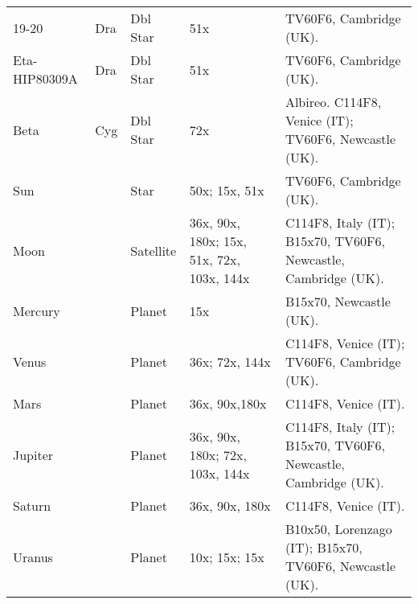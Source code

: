 \begin{longtable}{ p{0.7in}  p{0.3in}  p{0.6in}  p{0.9in}  p{5.8in} }
19-20 & Dra & Dbl Star & 51x & TV60F6, Cambridge (UK). \\ 
Eta-HIP80309A & Dra & Dbl Star & 51x & TV60F6, Cambridge (UK). \\ 
Beta & Cyg & Dbl Star & 72x & Albireo. C114F8, Venice (IT); TV60F6, Newcastle (UK). \\ 
Sun &  & Star & 50x; 15x, 51x & TV60F6, Cambridge (UK). \\ 
Moon &  & Satellite & 36x, 90x, 180x; 15x, 51x, 72x, 103x, 144x & C114F8, Italy (IT); B15x70, TV60F6, Newcastle, Cambridge (UK). \\ 
Mercury &  & Planet & 15x & B15x70, Newcastle (UK). \\ 
Venus &  & Planet & 36x; 72x, 144x & C114F8, Venice (IT); TV60F6, Cambridge (UK). \\ 
Mars &  & Planet & 36x, 90x,180x & C114F8, Venice (IT). \\ 
Jupiter &  & Planet & 36x, 90x, 180x; 72x, 103x, 144x & C114F8, Italy (IT); B15x70, TV60F6, Newcastle, Cambridge (UK). \\ 
Saturn &  & Planet & 36x, 90x, 180x & C114F8, Venice (IT). \\ 
Uranus &  & Planet & 10x; 15x; 15x & B10x50, Lorenzago (IT); B15x70, TV60F6, Newcastle (UK). \\ 
\hline 
\end{longtable} 
